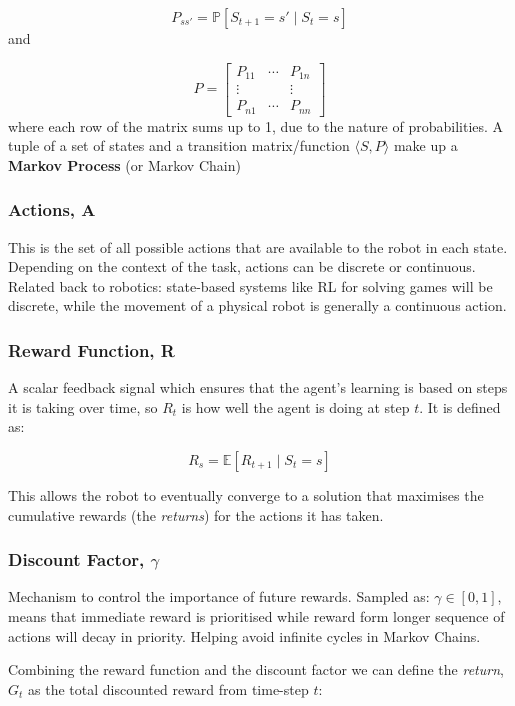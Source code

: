     \[ P_{ss'} = \mathbb{P} \left[S_{t+1} = s'  \mid S_t = s\right]\] 
    and 
    
    \[ P =
    \begin{bmatrix}
      P_{11} & \cdots & P_{1n} \\ 
      \vdots & & \vdots\\
      P_{n1} & \cdots & P_{nn}
    \end{bmatrix}
    \]
    where each row of the matrix sums up to 1, due to the nature of probabilities. A tuple of a set of states and a transition matrix/function \(\langle S, P \rangle\) make up a \textbf{Markov Process} (or Markov Chain)

  \subsubsection{Actions, A}
    This is the set of all possible actions that are available to the robot in each state. Depending on the context of the task, actions can be discrete or continuous. Related back to robotics: state-based systems like RL for solving games will be discrete, while the movement of a physical robot is generally a continuous action.

  \subsubsection{Reward Function, R}
    A scalar feedback signal which ensures that the agent's learning is based on steps it is taking over time, so $R_t$ is how well the agent is doing at step $t$. It is defined as:

    \[R_s = \mathbb{E} \left[R_{t+1} \mid S_t = s\right]\]
    
    This allows the robot to eventually converge to a solution that maximises the cumulative rewards (the \emph{returns}) for the actions it has taken. 
  
  \subsubsection{Discount Factor, $\gamma$}
    Mechanism to control the importance of future rewards. Sampled as: \(\gamma \in \left[0, 1\right]\), means that immediate reward is prioritised while reward form longer sequence of actions will decay in priority. Helping avoid infinite cycles in Markov Chains.

    Combining the reward function and the discount factor we can define the \emph{return}, $G_t$ as the total discounted reward from time-step $t$:

